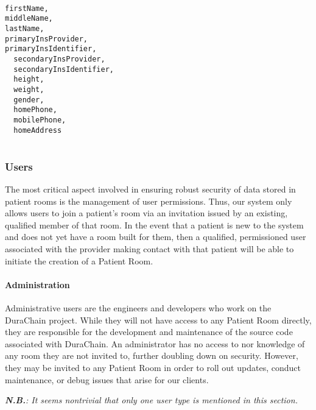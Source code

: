 \documentclass[letterpaper]{article}
\begin{document}
  \texttt{
  {\\
  firstName,\\
  middleName,\\
  lastName,\\
  primaryInsProvider,\\
  primaryInsIdentifier,\\ 
  secondaryInsProvider,\\ 
  secondaryInsIdentifier,\\ 
  height,\\ 
  weight,\\ 
  gender,\\ 
  homePhone,\\ 
  mobilePhone,\\ 
  homeAddress\\
  }
  }%

  \subsubsection{Users}
  The most critical aspect involved in ensuring robust security of data stored in patient rooms is the management of user permissions. Thus, our system only allows users to join a patient's room via an invitation issued by an existing, qualified member of that room. In the event that a patient is new to the system and does not yet have a room built for them, then a qualified, permissioned user associated with the provider making contact with that patient will be able to initiate the creation of a Patient Room.%
%
  \paragraph{Administration}
  Administrative users are the engineers and developers who work on the DuraChain project. While they will not have access to any Patient Room directly, they are responsible for the development and maintenance of the source code associated with DuraChain. An administrator has no access to nor knowledge of any room they are not invited to, further doubling down on security. However, they may be invited to any Patient Room in order to roll out updates, conduct maintenance, or debug issues that arise for our clients.%

  \textit{\textbf{N.B.}: It seems nontrivial that only one user type is mentioned in this section.}%
\end{document}
